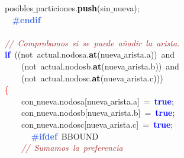 \mbox{}\ \ \ \ \ \ \ \ \ \ \ \ posibles$\_$particiones\textcolor{BrickRed}{.}\textbf{\textcolor{Black}{push}}\textcolor{BrickRed}{(}sin$\_$nueva\textcolor{BrickRed}{);} \\
\mbox{}\textbf{\textcolor{RoyalBlue}{\ \ \ \ \ \ \ \ \ \ \ \ \#endif}} \\
\mbox{} \\
\mbox{}\ \ \ \ \ \ \ \ \ \ \ \ \textit{\textcolor{Brown}{//\ Comprobamos\ si\ se\ puede\ añadir\ la\ arista.}} \\
\mbox{}\ \ \ \ \ \ \ \ \ \ \ \ \textbf{\textcolor{Blue}{if}}\ \textcolor{BrickRed}{((}\textcolor{TealBlue}{not}\ actual\textcolor{BrickRed}{.}nodosa\textcolor{BrickRed}{.}\textbf{\textcolor{Black}{at}}\textcolor{BrickRed}{(}nueva$\_$arista\textcolor{BrickRed}{.}a\textcolor{BrickRed}{))}\ and \\
\mbox{}\ \ \ \ \ \ \ \ \ \ \ \ \ \ \ \ \textcolor{BrickRed}{(}\textcolor{TealBlue}{not}\ actual\textcolor{BrickRed}{.}nodosb\textcolor{BrickRed}{.}\textbf{\textcolor{Black}{at}}\textcolor{BrickRed}{(}nueva$\_$arista\textcolor{BrickRed}{.}b\textcolor{BrickRed}{))}\ and \\
\mbox{}\ \ \ \ \ \ \ \ \ \ \ \ \ \ \ \ \textcolor{BrickRed}{(}\textcolor{TealBlue}{not}\ actual\textcolor{BrickRed}{.}nodosc\textcolor{BrickRed}{.}\textbf{\textcolor{Black}{at}}\textcolor{BrickRed}{(}nueva$\_$arista\textcolor{BrickRed}{.}c\textcolor{BrickRed}{)))} \\
\mbox{}\ \ \ \ \ \ \ \ \ \ \ \ \textcolor{Red}{\{} \\
\mbox{}\ \ \ \ \ \ \ \ \ \ \ \ \ \ \ \ con$\_$nueva\textcolor{BrickRed}{.}nodosa\textcolor{BrickRed}{[}nueva$\_$arista\textcolor{BrickRed}{.}a\textcolor{BrickRed}{]}\ \textcolor{BrickRed}{=}\ \textbf{\textcolor{Blue}{true}}\textcolor{BrickRed}{;} \\
\mbox{}\ \ \ \ \ \ \ \ \ \ \ \ \ \ \ \ con$\_$nueva\textcolor{BrickRed}{.}nodosb\textcolor{BrickRed}{[}nueva$\_$arista\textcolor{BrickRed}{.}b\textcolor{BrickRed}{]}\ \textcolor{BrickRed}{=}\ \textbf{\textcolor{Blue}{true}}\textcolor{BrickRed}{;} \\
\mbox{}\ \ \ \ \ \ \ \ \ \ \ \ \ \ \ \ con$\_$nueva\textcolor{BrickRed}{.}nodosc\textcolor{BrickRed}{[}nueva$\_$arista\textcolor{BrickRed}{.}c\textcolor{BrickRed}{]}\ \textcolor{BrickRed}{=}\ \textbf{\textcolor{Blue}{true}}\textcolor{BrickRed}{;} \\
\mbox{}\textbf{\textcolor{RoyalBlue}{\ \ \ \ \ \ \ \ \ \ \ \ \ \ \ \ \#ifdef}}\ BBOUND \\
\mbox{}\ \ \ \ \ \ \ \ \ \ \ \ \ \ \ \ \textit{\textcolor{Brown}{//\ Sumamos\ la\ preferencia}} \\
